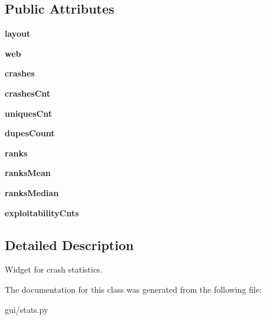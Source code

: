 \subsection*{Public Attributes}
\begin{DoxyCompactItemize}
\item 
\mbox{\label{classgui_1_1stats_1_1_stats_widget_a04104de10730ab33b3a7eccb858b93c5}} 
{\bfseries layout}
\item 
\mbox{\label{classgui_1_1stats_1_1_stats_widget_ae2eeaa7c5f16f90f36e5018c05a0537d}} 
{\bfseries web}
\item 
\mbox{\label{classgui_1_1stats_1_1_stats_widget_a320a11bb8c9dc0a5d1418a7cdf3d145e}} 
{\bfseries crashes}
\item 
\mbox{\label{classgui_1_1stats_1_1_stats_widget_a5e70b084058b77f241d42fff03e8e1d2}} 
{\bfseries crashes\+Cnt}
\item 
\mbox{\label{classgui_1_1stats_1_1_stats_widget_a75b9cbb22673d93d2f040e22c17fe027}} 
{\bfseries uniques\+Cnt}
\item 
\mbox{\label{classgui_1_1stats_1_1_stats_widget_a5c5f7b0eb0eac4ddcfa0eeda47f626de}} 
{\bfseries dupes\+Count}
\item 
\mbox{\label{classgui_1_1stats_1_1_stats_widget_ac03209775f4032d241b1eb42b06b83e1}} 
{\bfseries ranks}
\item 
\mbox{\label{classgui_1_1stats_1_1_stats_widget_a09701c6fef73b3d9959127d07f907be1}} 
{\bfseries ranks\+Mean}
\item 
\mbox{\label{classgui_1_1stats_1_1_stats_widget_af3545102f28978bd7261d52711ded78e}} 
{\bfseries ranks\+Median}
\item 
\mbox{\label{classgui_1_1stats_1_1_stats_widget_a89c1e3c12a3f0d3337f2ede8d2b56dd3}} 
{\bfseries exploitability\+Cnts}
\end{DoxyCompactItemize}


\subsection{Detailed Description}
Widget for crash statistics. 

The documentation for this class was generated from the following file\+:\begin{DoxyCompactItemize}
\item 
gui/stats.\+py\end{DoxyCompactItemize}
